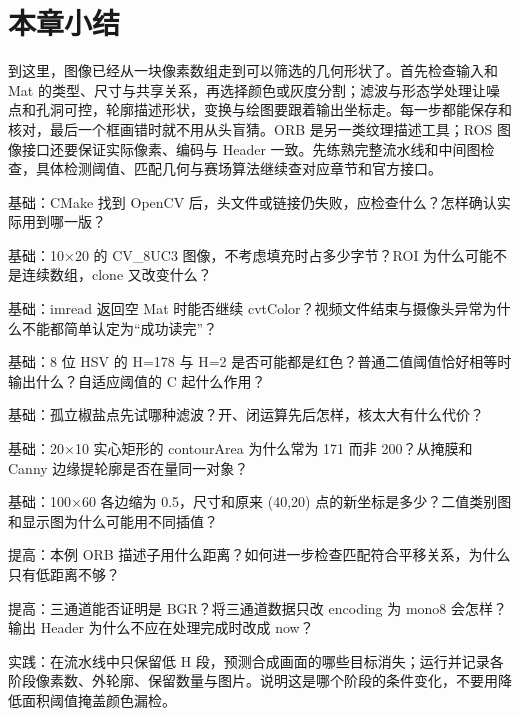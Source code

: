 \section{本章小结}
到这里，图像已经从一块像素数组走到可以筛选的几何形状了。首先检查输入和 Mat 的类型、尺寸与共享关系，再选择颜色或灰度分割；滤波与形态学处理让噪点和孔洞可控，轮廓描述形状，变换与绘图要跟着输出坐标走。每一步都能保存和核对，最后一个框画错时就不用从头盲猜。ORB 是另一类纹理描述工具；ROS 图像接口还要保证实际像素、编码与 Header 一致。先练熟完整流水线和中间图检查，具体检测阈值、匹配几何与赛场算法继续查对应章节和官方接口。

\begin{problemset}
\renewcommand{\theenumi}{\arabic{enumi}}
\item\label{prob:v2-cv-1} 基础：CMake 找到 OpenCV 后，头文件或链接仍失败，应检查什么？怎样确认实际用到哪一版？
\item\label{prob:v2-cv-2} 基础：10×20 的 CV\_8UC3 图像，不考虑填充时占多少字节？ROI 为什么可能不是连续数组，clone 又改变什么？
\item\label{prob:v2-cv-3} 基础：imread 返回空 Mat 时能否继续 cvtColor？视频文件结束与摄像头异常为什么不能都简单认定为“成功读完”？
\item\label{prob:v2-cv-4} 基础：8 位 HSV 的 H=178 与 H=2 是否可能都是红色？普通二值阈值恰好相等时输出什么？自适应阈值的 C 起什么作用？
\item\label{prob:v2-cv-5} 基础：孤立椒盐点先试哪种滤波？开、闭运算先后怎样，核太大有什么代价？
\item\label{prob:v2-cv-6} 基础：20×10 实心矩形的 contourArea 为什么常为 171 而非 200？从掩膜和 Canny 边缘提轮廓是否在量同一对象？
\item\label{prob:v2-cv-7} 基础：100×60 各边缩为 0.5，尺寸和原来 (40,20) 点的新坐标是多少？二值类别图和显示图为什么可能用不同插值？
\item\label{prob:v2-cv-8} 提高：本例 ORB 描述子用什么距离？如何进一步检查匹配符合平移关系，为什么只有低距离不够？
\item\label{prob:v2-cv-9} 提高：三通道能否证明是 BGR？将三通道数据只改 encoding 为 mono8 会怎样？输出 Header 为什么不应在处理完成时改成 now？
\item\label{prob:v2-cv-10} 实践：在流水线中只保留低 H 段，预测合成画面的哪些目标消失；运行并记录各阶段像素数、外轮廓、保留数量与图片。说明这是哪个阶段的条件变化，不要用降低面积阈值掩盖颜色漏检。
\end{problemset}

